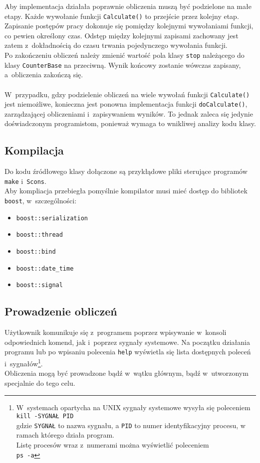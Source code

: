 \documentclass[a4paper]{article}
\begin{document}
Aby implementacja działała poprawnie obliczenia muszą być podzielone na małe etapy.
Każde wywołanie funkcji \texttt{Calculate()} to przejście przez kolejny etap.\\
Zapisanie postępów pracy dokonuje się pomiędzy kolejnymi wywołaniami funkcji, co pewien określony czas.
Odstęp między kolejnymi zapisami zachowany jest zatem z~dokładnością do czasu trwania pojedynczego wywołania funkcji.\\
Po zakończeniu obliczeń należy zmienić wartość pola klasy \texttt{stop} należącego do klasy \texttt{CounterBase} na przeciwną.
Wynik końcowy zostanie wówczas zapisany, a~obliczenia zakończą się.\\
~\\
W~przypadku, gdzy podzielenie obliczeń na wiele wywołań funkcji \texttt{Calculate()} jest niemożliwe, konieczna jest ponowna implementacja funkcji \texttt{doCalculate()}, zarządzającej obliczeniami i~zapisywaniem wyników. 
To jednak zaleca się jedynie doświadczonym programistom, ponieważ wymaga to wnikliwej analizy kodu klasy.
\subsection{Kompilacja}
Do kodu źródłowego klasy dołączone są przykłądowe pliki sterujące programów \texttt{make} i~\texttt{Scons}.\\
Aby kompliacja przebiegła pomyślnie kompilator musi mieć dostęp do bibliotek \texttt{boost}, w~szczególności:
\begin{itemize}
\item \texttt{boost::serialization}
\item \texttt{boost::thread} 
\item \texttt{boost::bind}
\item \texttt{boost::date\_time}
\item \texttt{boost::signal}
\end{itemize}
\subsection{Prowadzenie obliczeń}
Użytkownik komunikuje się z~programem poprzez wpisywanie w~konsoli odpowiednich komend, jak i~poprzez sygnały systemowe. 
Na początku działania programu lub po wpisaniu polecenia \texttt{help} wyświetla się lista dostępnych poleceń i~sygnałów\footnote{W~systemach opartycha na UNIX sygnały systemowe wysyła się poleceniem\\\texttt{kill -SYGNAŁ PID}\\gdzie \texttt{SYGNAŁ} to nazwa sygnału, a \texttt{PID} to numer identyfikacyjny procesu, w ramach którego działa program.\\Listę procesów wraz z~numerami można wyświetlić poleceniem\\\texttt{ps -a}}.\\
Obliczenia mogą być prowadzone bądź w~wątku głównym, bądź w~utworzonym specjalnie do tego celu.
\end{document}
